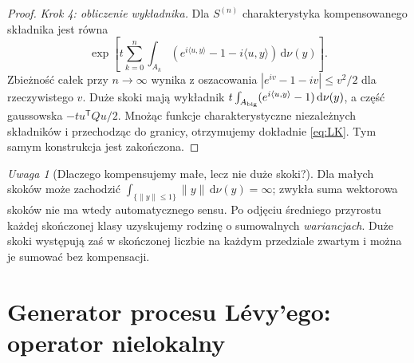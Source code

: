 \documentclass[11pt,a4paper,oneside]{report}
\numberwithin{equation}{chapter}
\theoremstyle{plain}
\theoremstyle{definition}
\theoremstyle{remark}
\newtheorem{uwaga}{Uwaga}[chapter]
\newcommand{\dd}{\mathrm{d}}
\begin{document}
\begin{proof}
\emph{Krok 4: obliczenie wykładnika.} Dla $S^{(n)}$
charakterystyka kompensowanego składnika jest równa
\[
\exp\left[t\sum_{k=0}^n\int_{A_k}
(e^{i\langle u,y\rangle}-1-i\langle u,y\rangle)
\,\dd\nu(y)\right].
\]
Zbieżność całek przy $n\to\infty$ wynika z oszacowania
$|e^{iv}-1-iv|\le v^2/2$ dla rzeczywistego $v$.
Duże skoki mają wykładnik
$t\int_{A_{\rm big}}(e^{i\langle u,y\rangle}-1)\,\dd\nu(y)$,
a część gaussowska $-tu^{\mathsf T}Qu/2$.
Mnożąc funkcje charakterystyczne niezależnych składników
i przechodząc do granicy, otrzymujemy dokładnie
\eqref{eq:LK}. Tym samym konstrukcja jest zakończona.
\end{proof}

\begin{uwaga}[Dlaczego kompensujemy małe, lecz nie duże skoki?]
Dla małych skoków może zachodzić
$\int_{\{\|y\|\le1\}}\|y\|\,\dd\nu(y)=\infty$;
zwykła suma wektorowa skoków nie ma wtedy automatycznego
sensu. Po odjęciu średniego przyrostu każdej skończonej
klasy uzyskujemy rodzinę o sumowalnych \emph{wariancjach}.
Duże skoki występują zaś w skończonej liczbie na każdym
przedziale zwartym i można je sumować bez kompensacji.
\end{uwaga}

\section{Generator procesu Lévy'ego: operator nielokalny}\label{sec:volIII:10:06}
\end{document}
